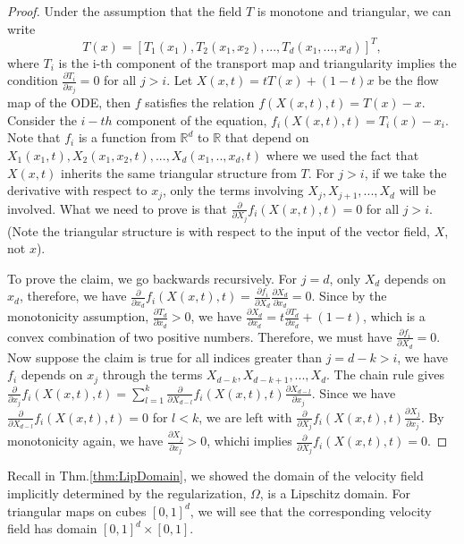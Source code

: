 \begin{proof}
Under the assumption that the field $T$ is monotone and triangular, we can write $$T(x) = [T_1(x_1), T_2(x_1,x_2),..., T_d(x_1,..., x_d)]^T,$$ where $T_i$ is the i-th component of the transport map and triangularity implies the condition $\frac{\partial T_i}{\partial x_j} = 0$ for all $j > i$. Let $X(x,t) = tT(x) + (1-t)x$ be the flow map of the ODE, then $f$ satisfies the relation $f(X(x,t), t) = T(x) - x$. Consider the $i-th$ component of the equation, $f_i(X(x,t), t) = T_i(x) - x_i$. Note that $f_i$ is a function from $\mathbb{R}^d$ to $\mathbb{R}$ that depend on $X_1(x_1,t), X_2(x_1,x_2, t),...,X_d(x_1,..,x_d,t)$ where we used the fact that $X(x,t)$ inherits the same triangular structure from $T$. For $j>i$, if we take the derivative with respect to $x_j$, only the terms involving $X_j, X_{j+1}, ..., X_d$ will be involved. What we need to prove is that $\frac{\partial}{\partial X_j}f_i(X(x,t), t) = 0$ for all $j>i$. (Note the triangular structure is with respect to the input of the vector field, $X$, not $x$).

To prove the claim, we go backwards recursively. For $j = d$, only $X_d$ depends on $x_d$, therefore, we have $\frac{\partial}{\partial x_d}f_i(X(x,t), t) = \frac{\partial f_i}{\partial X_d}\frac{\partial X_d}{\partial x_d} = 0$. Since by the monotonicity assumption, $\frac{\partial T_d}{\partial x_d}>0$,  we have $\frac{\partial X_d}{\partial x_d} = t\frac{\partial T_d}{\partial x_d}+(1-t)$, which is a convex combination of two positive numbers. Therefore, we must have $\frac{\partial f_i}{\partial X_d} = 0$. Now suppose the claim is true for all indices greater than $j = d - k > i$, we have $f_i$ depends on $x_j$ through the terms $X_{d-k}, X_{d-k+1}, ..., X_{d}$. The chain rule gives $\frac{\partial}{\partial x_j}f_i(X(x,t), t) = \sum_{l=1}^k\frac{\partial}{\partial X_{d-l}}f_i(X(x,t), t)\frac{\partial X_{d-l}}{\partial x_{j}}$. Since we have $\frac{\partial}{\partial X_{d-l}}f_i(X(x,t), t) = 0$ for $l < k$, we are left with $\frac{\partial}{\partial X_{j}}f_i(X(x,t), t)\frac{\partial X_{j}}{\partial x_{j}}$. By monotonicity again, we have $\frac{\partial X_{j}}{\partial x_{j}} > 0$, whichi implies $\frac{\partial}{\partial X_{j}}f_i(X(x,t), t) = 0$. 




\end{proof}

Recall in Thm.\ref{thm:LipDomain}, we showed the domain of the velocity field implicitly determined by the regularization, $\Omega$, is a Lipschitz domain. For triangular maps on cubes $[0,1]^d$, we will see that the corresponding velocity field has domain $[0,1]^d\times[0,1]$. 


